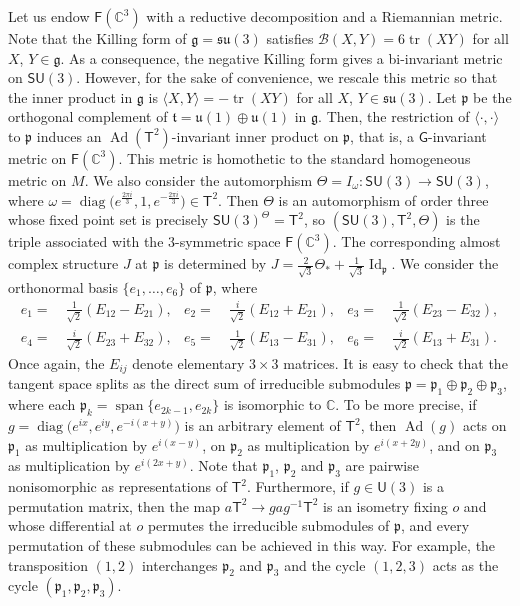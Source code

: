 \documentclass[11pt,a4paper,final]{amsart}
\newcommand{\s}{\mathsf}
\newcommand{\g}{\mathfrak}
\newcommand{\Ad}{\operatorname{Ad}}
\newcommand{\C}{\mathbb{C}}
\newcommand{\vecspan}{\operatorname{span}}
\theoremstyle{definition}
\begin{document}
Let us endow $\mathsf{F}(\C^{3})$ with a reductive decomposition and a Riemannian metric.
Note that the Killing form of $\g{g}=\g{su}(3)$ satisfies $\mathcal{B}(X,Y)=6\operatorname{tr}(XY)$ for all $X$, $Y\in \g{g}$.
As a consequence, the negative Killing form gives a bi-invariant metric on $\mathsf{SU}(3)$.
However, for the sake of convenience, we rescale this metric so that the inner product in $\g{g}$ is $\langle X,Y \rangle = -\operatorname{tr}(XY)$ for all $X$, $Y\in\g{su}(3)$.
Let $\g{p}$ be the orthogonal complement of $\g{t}=\g{u}(1)\oplus\g{u}(1)$ in $\g{g}$.
Then, the restriction of $\langle \cdot ,\cdot \rangle$ to $\g{p}$ induces an $\Ad(\mathsf{T}^2)$-invariant inner product on $\g{p}$, that is, a $\mathsf{G}$-invariant metric on $\mathsf{F}(\C^{3})$.
This metric is homothetic to the standard homogeneous metric on $M$.
We also consider the automorphism $\Theta=I_{\omega}\colon \mathsf{SU}(3)\to\mathsf{SU}(3)$, where $\omega=\operatorname{diag}\bigl(e^{\frac{2\pi i}{3}},1,e^{-\frac{2\pi i}{3}}\bigr)\in\s{T}^{2}$.
Then $\Theta$ is an automorphism of order three whose fixed point set is precisely $\mathsf{SU}(3)^{\Theta}=\mathsf{T}^2$, so $(\mathsf{SU}(3),\mathsf{T}^2,\Theta)$ is the triple associated with the $3$-symmetric space $\mathsf{F}(\C^{3})$.
The corresponding almost complex structure $J$ at $\g{p}$ is determined by $J=\frac{2}{\sqrt{3}}\Theta_{*}+\frac{1}{\sqrt{3}}\operatorname{Id}_{\g{p}}$.
We consider the orthonormal basis $\{e_{1},\dots, e_{6}\}$ of $\g{p}$, where
\begin{align*}
	e_1=&~\frac{1}{\sqrt{2}}(E_{12}-E_{21}), & e_2=&~\frac{i}{\sqrt{2}}(E_{12}+E_{21}), & e_3=&~\frac{1}{\sqrt{2}}(E_{23}-E_{32}), \\
	e_4=&~\frac{i}{\sqrt{2}}(E_{23}+E_{32}), & e_5=&~\frac{1}{\sqrt{2}}(E_{13}-E_{31}), & e_6=&~\frac{i}{\sqrt{2}}(E_{13}+E_{31}).
\end{align*}
Once again, the $E_{ij}$ denote elementary $3\times 3$ matrices.
It is easy to check that the tangent space splits as the direct sum of irreducible submodules $\g{p}=\g{p}_{1}\oplus\g{p}_{2}\oplus\g{p}_{3}$, where each $\g{p}_{k}=\vecspan\{e_{2k-1},e_{2k}\}$ is isomorphic to $\C$.
To be more precise, if $g=\operatorname{diag}\bigl(e^{i x},e^{i y},e^{-i (x+y)}\bigr)$ is an arbitrary element of $\mathsf{T}^2$, then $\Ad(g)$ acts on $\g{p_1}$ as multiplication by $e^{i(x-y)}$, on $\g{p}_{2}$ as multiplication by $e^{i(x+2y)}$, and on $\g{p}_{3}$ as multiplication by $e^{i(2x+y)}$.
Note that $\g{p}_{1}$, $\g{p}_{2}$ and $\g{p}_{3}$ are pairwise nonisomorphic as representations of $\mathsf{T}^2$.
Furthermore, if $g\in\s{U}(3)$ is a permutation matrix, then the map $a\s{T}^{2}\to gag^{-1}\s{T}^{2}$ is an isometry fixing $o$ and whose differential at $o$ permutes the irreducible submodules of $\g{p}$, and every permutation of these submodules can be achieved in this way.
For example, the transposition $(1,2)$ interchanges $\g{p}_{2}$ and $\g{p}_{3}$ and the cycle $(1,2,3)$ acts as the cycle $(\g{p}_{1},\g{p}_{2},\g{p}_{3})$.
	
\end{document}

